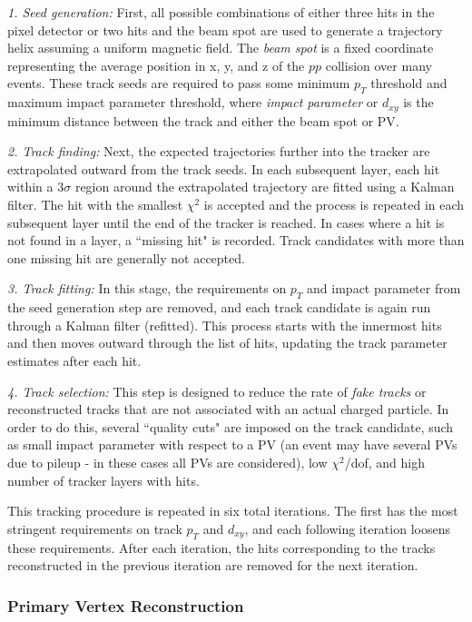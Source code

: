 \noindent\emph{1. Seed generation:} First, all possible combinations of either three hits in the pixel detector or two hits and the beam spot are used to generate a trajectory helix assuming a uniform magnetic field. The \textit{beam spot} is a fixed coordinate representing the average position in x, y, and z of the $pp$ collision over many events. These track seeds are required to pass some minimum $p_T$ threshold and maximum impact parameter threshold, where \textit{impact parameter} or $d_{xy}$ is the minimum distance between the track and either the beam spot or PV.


\noindent\emph{2. Track finding:} Next, the expected trajectories further into the tracker are extrapolated outward from the track seeds. In each subsequent layer, each hit within a $3\sigma$ region around the extrapolated trajectory are fitted using a Kalman filter\cite{Kalman}. The hit with the smallest $\chi^2$ is accepted and the process is repeated in each subsequent layer until the end of the tracker is reached. In cases where a hit is not found in a layer, a ``missing hit" is recorded. Track candidates with more than one missing hit are generally not accepted.


\noindent\emph{3. Track fitting:} In this stage, the requirements on $p_T$ and impact parameter from the seed generation step are removed, and each track candidate is again run through a Kalman filter (refitted). This process starts with the innermost hits and then moves outward through the list of hits, updating the track parameter estimates after each hit.


\noindent\emph{4. Track selection:} This step is designed to reduce the rate of \textit{fake tracks} or reconstructed tracks that are not associated with an actual charged particle. In order to do this, several ``quality cuts" are imposed on the track candidate, such as small impact parameter with respect to a PV (an event may have several PVs due to pileup - in these cases all PVs are considered), low $\chi^2$/dof, and high number of tracker layers with hits.


This tracking procedure is repeated in six total iterations. The first has the most stringent requirements on track $p_T$ and $d_{xy}$, and each following iteration loosens these requirements. After each iteration, the hits corresponding to the tracks reconstructed in the previous iteration are removed for the next iteration.

\subsubsection{Primary Vertex Reconstruction}

